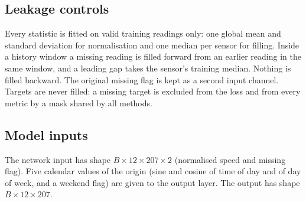\documentclass[conference]{IEEEtran}
\begin{document}
\subsection{Leakage controls}
Every statistic is fitted on valid training readings only: one global mean and standard deviation for normalisation and one median per sensor for filling. Inside a history window a missing reading is filled forward from an earlier reading in the same window, and a leading gap takes the sensor's training median. Nothing is filled backward. The original missing flag is kept as a second input channel. Targets are never filled: a missing target is excluded from the loss and from every metric by a mask shared by all methods.

\subsection{Model inputs}
The network input has shape $B\times12\times207\times2$ (normalised speed and missing flag). Five calendar values of the origin (sine and cosine of time of day and of day of week, and a weekend flag) are given to the output layer. The output has shape $B\times12\times207$.
\end{document}
